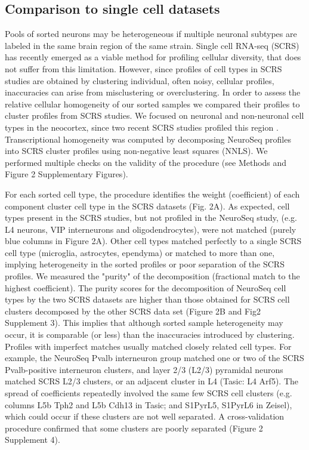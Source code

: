 \subsection{Comparison to single cell datasets}
Pools of sorted neurons may be heterogeneous if multiple neuronal subtypes are labeled in the same brain region of the same strain. Single cell RNA-seq (SCRS) has recently emerged as a viable method for profiling cellular diversity, that does not suffer from this limitation. However, since profiles of cell types in SCRS studies are obtained by clustering individual, often noisy, cellular profiles, inaccuracies can arise from misclustering or overclustering. In order to assess the relative cellular homogeneity of our sorted samples we compared their profiles to cluster profiles from SCRS studies. We focused on neuronal and non-neuronal cell types in the neocortex, since two recent SCRS studies profiled this region \cite{Tasic_2016,Zeisel_2015}. Transcriptional homogeneity was computed by decomposing NeuroSeq profiles into SCRS cluster profiles using non-negative least squares (NNLS). We performed multiple checks on the validity of the procedure (see Methods and Figure 2 Supplementary Figures). 

For each sorted cell type, the procedure identifies the weight (coefficient) of each component cluster cell type in the SCRS datasets (Fig. 2A). As expected, cell types present in the SCRS studies, but not profiled in the NeuroSeq study, (e.g. L4 neurons, VIP interneurons and oligodendrocytes), were not matched (purely blue columns in Figure 2A). Other cell types matched perfectly to a single SCRS cell type (microglia, astrocytes, ependyma) or matched to more than one, implying heterogeneity in the sorted profiles or poor separation of the SCRS profiles. We measured the "purity" of the decomposition (fractional match to the highest coefficient). The purity scores for the decomposition of NeuroSeq cell types by the two SCRS datasets are higher than those obtained for SCRS cell clusters decomposed by the other SCRS data set (Figure 2B and Fig2 Supplement 3). This implies that although sorted sample heterogeneity may occur, it is comparable (or less) than the inaccuracies introduced by clustering. Profiles with imperfect matches usually matched closely related cell types. For example, the NeuroSeq Pvalb interneuron group matched one or two of the SCRS Pvalb-positive interneuron clusters, and layer 2/3 (L2/3) pyramidal neurons matched SCRS L2/3 clusters, or an adjacent cluster in L4 (Tasic: L4 Arf5). The spread of coefficients repeatedly involved the same few SCRS cell clusters (e.g. columns L5b Tph2 and L5b Cdh13 in Tasic; and S1PyrL5,  S1PyrL6 in Zeisel), which could occur if these clusters are not well separated. A cross-validation procedure confirmed that some clusters are poorly separated (Figure 2 Supplement 4).   

